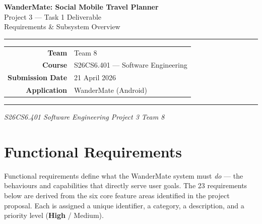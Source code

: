 \documentclass[12pt, a4paper]{article}
\newcommand{\high}{\textbf{High}}
\newcommand{\medium}{Medium}
\begin{document}
\thispagestyle{empty}

\vspace*{2.5cm}

\begin{center}
  {\LARGE\bfseries WanderMate: Social Mobile Travel Planner}\\[0.8em]
  {\large Project 3 --- Task 1 Deliverable}\\[0.4em]
  {\large Requirements \& Subsystem Overview}
\end{center}

\vspace{1.2em}
\noindent\textcolor{rulegray}{\rule{\linewidth}{0.4pt}}
\vspace{1.0em}

\begin{center}
\begin{tabular}{rl}
  \textbf{Team}            & Team 8 \\[0.25em]
  \textbf{Course}          & S26CS6.401 --- Software Engineering \\[0.25em]
  \textbf{Submission Date} & 21 April 2026 \\[0.25em]
  \textbf{Application}     & WanderMate (Android) \\[0.25em]
\end{tabular}
\end{center}

\vspace{1.0em}
\noindent\textcolor{rulegray}{\rule{\linewidth}{0.4pt}}

\vfill

\begin{center}
  \small\textit{S26CS6.401 Software Engineering \textbar{} Project 3 \textbar{} Team 8}
\end{center}

\newpage

\tableofcontents
\newpage

\section{Functional Requirements}

Functional requirements define what the WanderMate system must \emph{do} --- the behaviours and capabilities that directly serve user goals. The 23 requirements below are derived from the six core feature areas identified in the project proposal. Each is assigned a unique identifier, a category, a description, and a priority level (\high{} / \medium).
\end{document}
